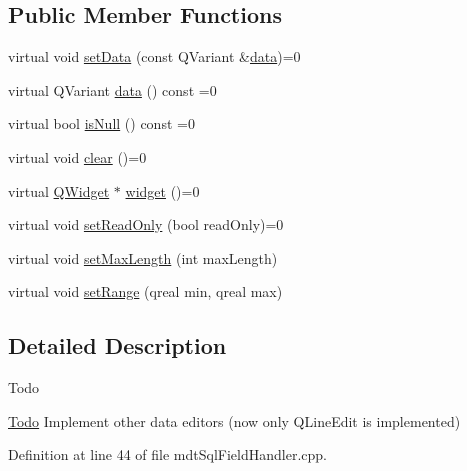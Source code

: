 \subsection*{Public Member Functions}
\begin{DoxyCompactItemize}
\item 
virtual void \hyperlink{classmdt_sql_field_handler_abstract_data_widget_a5d9e6c6bfa923f07598179c71c88ba4b}{set\-Data} (const Q\-Variant \&\hyperlink{classmdt_sql_field_handler_abstract_data_widget_a90f1259501179fc28cd46bdf9c5f7d55}{data})=0
\item 
virtual Q\-Variant \hyperlink{classmdt_sql_field_handler_abstract_data_widget_a90f1259501179fc28cd46bdf9c5f7d55}{data} () const =0
\item 
virtual bool \hyperlink{classmdt_sql_field_handler_abstract_data_widget_a077d5b1b9a0cb592be9def99cdc6ad3a}{is\-Null} () const =0
\item 
virtual void \hyperlink{classmdt_sql_field_handler_abstract_data_widget_a54c1bc177f2a5f06d29ce24a801b6b3e}{clear} ()=0
\item 
virtual \hyperlink{class_q_widget}{Q\-Widget} $\ast$ \hyperlink{classmdt_sql_field_handler_abstract_data_widget_a460c76d650eba635ffb42951c7adbb50}{widget} ()=0
\item 
virtual void \hyperlink{classmdt_sql_field_handler_abstract_data_widget_a5d358ea305c375309c83be572dae2562}{set\-Read\-Only} (bool read\-Only)=0
\item 
virtual void \hyperlink{classmdt_sql_field_handler_abstract_data_widget_a7167463d910f13cff681668b4bc0e139}{set\-Max\-Length} (int max\-Length)
\item 
virtual void \hyperlink{classmdt_sql_field_handler_abstract_data_widget_a1c391f7af13f1a451354273352934801}{set\-Range} (qreal min, qreal max)
\end{DoxyCompactItemize}


\subsection{Detailed Description}
\begin{DoxyRefDesc}{Todo}
\item[\hyperlink{todo__todo000083}{Todo}]Implement other data editors (now only Q\-Line\-Edit is implemented) \end{DoxyRefDesc}


Definition at line 44 of file mdt\-Sql\-Field\-Handler.\-cpp.




